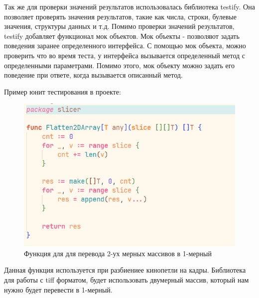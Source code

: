 Так же для проверки значений результатов использовалась библиотека testify. Она позволяет проверять значения результатов, такие как числа, строки, булевые значения, структуры данных и т.д.
Помимо проверки значений результатов, testify добавляет функционал мок объектов. Мок объекты - позволяют задать
поведения заранее определенного интерфейса. С помощью мок объекта, можно проверить что во время теста, у интерфейса
вызывается определенный метод с определенными параметрами. Помимо этого, мок объекту можно задать его поведение при
ответе, когда вызывается описанный метод.

Пример юнит тестирования в проекте:
\begin{figure}[H]%
	\begin{center}
		\includegraphics[width=.9\columnwidth]{./img/new/test_slice_1.png}%
	\end{center}
	\caption{Функция для для перевода 2-ух мерных массивов в 1-мерный}%
	\label{pic:test_slice_1}%
\end{figure}

Данная функция используется при разбиениее кинопетли на кадры. Библиотека для работы с tiff форматом, будет использовать
двумерный массив, который нам нужно будет перевести в 1-мерный.

